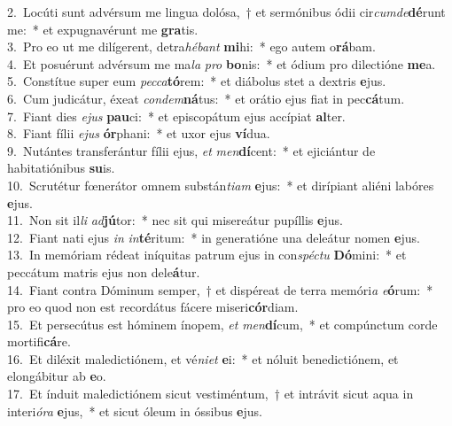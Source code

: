 {2.~}Locúti sunt advérsum me lingua dolósa,~† et sermónibus ódii cir\textit{cum}\textit{de}\textbf{dé}runt me:~* et expugnavérunt me \textbf{gra}tis.\\
{3.~}Pro eo ut me dilígerent, detra\textit{hé}\textit{bant} \textbf{mi}hi:~* ego autem o\textbf{rá}bam.\\
{4.~}Et posuérunt advérsum me ma\textit{la} \textit{pro} \textbf{bo}nis:~* et ódium pro dilectióne \textbf{me}a.\\
{5.~}Constítue super eum \textit{pec}\textit{ca}\textbf{tó}rem:~* et diábolus stet a dextris \textbf{e}jus.\\
{6.~}Cum judicátur, éxeat \textit{con}\textit{dem}\textbf{ná}tus:~* et orátio ejus fiat in pec\textbf{cá}tum.\\
{7.~}Fiant dies \textit{e}\textit{jus} \textbf{pau}ci:~* et episcopátum ejus accípiat \textbf{al}ter.\\
{8.~}Fiant fílii \textit{e}\textit{jus} \textbf{ór}phani:~* et uxor ejus \textbf{ví}dua.\\
{9.~}Nutántes transferántur fílii ejus, \textit{et} \textit{men}\textbf{dí}cent:~* et ejiciántur de habitatiónibus \textbf{su}is.\\
{10.~}Scrutétur fœnerátor omnem substán\textit{ti}\textit{am} \textbf{e}jus:~* et dirípiant aliéni labóres \textbf{e}jus.\\
{11.~}Non sit il\textit{li} \textit{ad}\textbf{jú}tor:~* nec sit qui misereátur pupíllis \textbf{e}jus.\\
{12.~}Fiant nati ejus \textit{in} \textit{in}\textbf{té}ritum:~* in generatióne una deleátur nomen \textbf{e}jus.\\
{13.~}In memóriam rédeat iníquitas patrum ejus in con\textit{spé}\textit{ctu} \textbf{Dó}mini:~* et peccátum matris ejus non dele\textbf{á}tur.\\
{14.~}Fiant contra Dóminum semper,~† et dispéreat de terra memóri\textit{a} \textit{e}\textbf{ó}rum:~* pro eo quod non est recordátus fácere miseri\textbf{cór}diam.\\
{15.~}Et persecútus est hóminem ínopem, \textit{et} \textit{men}\textbf{dí}cum,~* et compúnctum corde mortifi\textbf{cá}re.\\
{16.~}Et diléxit maledictiónem, et vé\textit{ni}\textit{et} \textbf{e}i:~* et nóluit benedictiónem, et elongábitur ab \textbf{e}o.\\
{17.~}Et índuit maledictiónem sicut vestiméntum,~† et intrávit sicut aqua in interi\textit{ó}\textit{ra} \textbf{e}jus,~* et sicut óleum in óssibus \textbf{e}jus.\\
